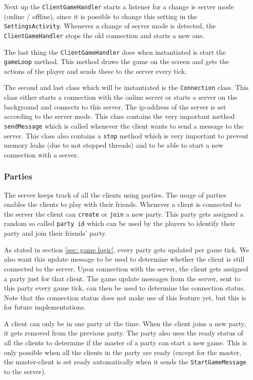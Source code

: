 \documentclass[../main.tex]{subfiles}
\begin{document}
        Next up the \texttt{ClientGameHandler} starts a listener for a change is server mode (online / offline), since it is possible to change this setting in the \texttt{SettingsActivity}. Whenever a change of server mode is detected, the \texttt{ClientGameHandler} stops the old connection and starts a new one. 
        
        The last thing the \texttt{ClientGameHandler} does when instantiated is start the \texttt{gameLoop} method. This method draws the game on the screen and gets the actions of the player and sends these to the server every tick.

        The second and last class which will be instantiated is the \texttt{Connection} class. This class either starts a connection with the online server or starts a server on the background and connects to this server. The ip-address of the server is set according to the server mode. This class contains the very important method \texttt{sendMessage} which is called whenever the client wants to send a message to the server. This class also contains a \texttt{stop} method which is very important to prevent memory leaks (due to not stopped threads) and to be able to start a new connection with a server. 

        \subsubsection{Parties}
        The server keeps track of all the clients using parties. The usage of parties enables the clients to play with their friends. Whenever a client is connected to the server the client can \texttt{create} or \texttt{join} a new party. This party gets assigned a random so called \texttt{party id} which can be used by the players to identify their party and join their friends' party.
        
        As stated in section \ref{sec: game logic}, every party gets updated per game tick. We also want this update message to be used to determine whether the client is still connected to the server. Upon connection with the server, the client gets assigned a party just for that client. The game update messages from the server, sent to this party every game tick, can then be used to determine the connection status. Note that the connection status does not make use of this feature yet, but this is for future implementations.

        A client can only be in one party at the time. When the client joins a new party, it gets removed from the previous party. The party also uses the ready status of all the clients to determine if the master of a party can start a new game. This is only possible when all the clients in the party are ready (except for the master, the master-client is set ready automatically when it sends the \texttt{StartGameMessage} to the server).
\end{document}
